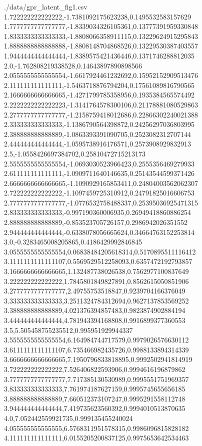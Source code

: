 \begin{filecontents*}{./data/gpr_latent_fig1.csv}
    1.722222222222222,-1.7381092175623238,0.1495532583157629
    1.7777777777777777,-1.8339034326105361,0.13777391959330848
    1.8333333333333333,-1.8808066358911115,0.13229624915295843
    1.8888888888888888,-1.8808148704868526,0.13229530387403557
    1.9444444444444444,-1.8389575421436446,0.1371746288812035
    2.0,-1.762808219338528,0.14643897890898566
    2.0555555555555554,-1.6617924461232692,0.15952152909513476
    2.111111111111111,-1.5463718876794204,0.17561089816790565
    2.1666666666666665,-1.4271799785358956,0.1935384565574492
    2.2222222222222223,-1.3141764578300106,0.21178881080529863
    2.2777777777777777,-1.2158759418012686,0.22866302240021388
    2.333333333333333,-1.1386790564398872,0.24256297036803995
    2.388888888888889,-1.0863393391090705,0.2523082312707144
    2.444444444444444,-1.0595738916176571,0.2573908929832913
    2.5,-1.0558426697384702,0.25810472715213173
    2.5555555555555554,-1.0693030523966423,0.2555356469279933
    2.611111111111111,-1.0909711640146635,0.25143544599371426
    2.6666666666666665,-1.1090929165853411,0.24804003562062307
    2.722222222222222,-1.1097459725310912,0.24791825016606753
    2.7777777777777777,-1.0776532758488337,0.25395036925471315
    2.833333333333333,-0.997190360006935,0.26949418860886254
    2.888888888888889,-0.853523705726157,0.2986942026351552
    2.944444444444444,-0.6338078056665624,0.34664763152253814
    3.0,-0.3283465008205865,0.4186429992846845
    3.0555555555555554,0.06838484205618314,0.5170895511116412
    3.1111111111111107,0.5569529512258093,0.6357472192793857
    3.1666666666666665,1.132487738026538,0.7562977100837649
    3.222222222222222,1.7845801849827891,0.8562615050851906
    3.2777777777777777,2.49755753518847,0.9239704166376049
    3.333333333333333,3.2511324784312694,0.9627137853569252
    3.388888888888889,4.021376394857483,0.9823874902884194
    3.444444444444444,4.781943394168808,0.9916899377360553
    3.5,5.505458755235512,0.995951929944337
    3.5555555555555554,6.164984744717579,0.9979026576630112
    3.6111111111111107,6.735466982435726,0.9988133894314339
    3.6666666666666665,7.1950796833818895,0.9992502941814919
    3.722222222222222,7.526406822593906,0.9994616196879862
    3.7777777777777777,7.717385130530989,0.9995551751969357
    3.833333333333333,7.761974187627159,0.9995745655656185
    3.888888888888889,7.660512373107247,0.9995291558112748
    3.944444444444444,7.419735623560392,0.9994010513870635
    4.0,7.052442559921735,0.999135455240024
    4.055555555555555,6.5768311951578315,0.9986096815828182
    4.111111111111111,6.0155205200837125,0.9975653642534463

\end{filecontents*}
